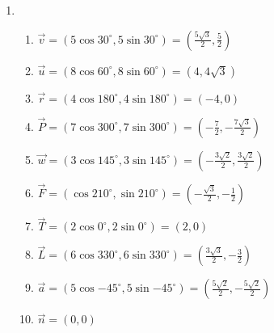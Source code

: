 \documentclass[a4paper]{article}
\newcommand{\exercise}{\item}
\newcommand{\SEL}[1]{ \left\{\begin{matrix} #1 \end{matrix}\right. }
\newcommand{\df}[2]{\displaystyle\frac{#1}{#2}}
\newcommand{\degs}{^{\circ}}
\begin{document}
\begin{enumerate}
\begin{enumerate} [label=(\alph*)]
		\item $|(0,5)| = \sqrt{0^2+5^2} = \sqrt{25} = 5$. $\theta= 90\degs$. $\SEL{v_x=5 \cos{90\degs} \\ v_y=5 \sin{90\degs} }$
		\item $|(-2,1)| = \sqrt{(-2)^2+1^2} = \sqrt{5}$. $\theta=\arctan\left(\df{1}{-2}\right) +180\degs \simeq 153.43\degs$. $\SEL{v_x \simeq \sqrt{5} \cos{153\degs} \\ v_y \simeq \sqrt{5} \sin{153\degs} }$
		\item $|(-3,-4)| = \sqrt{(-3)^2+(-4)^2} = \sqrt{25} = 5$. $\theta=\arctan\left(\df{-4}{-3}\right) +180\degs \simeq 233.13\degs$. $\SEL{v_x \simeq 5 \cos{233\degs} \\ v_y \simeq 5 \sin{233\degs} }$
		\item $|(-4,0)| = \sqrt{(-4)^2+0^2} = \sqrt{16} = 4$. $\theta= 180\degs$. $\SEL{v_x = 4 \cos{180\degs} \\ v_y = 4 \sin{180\degs} }$
		\item $|(0,0)| = \sqrt{0^2+0^2} = \sqrt{0} = 0$. No se define un ángulo. $\SEL{v_x = 0 \\ v_y= 0}$
\end{enumerate}\exercise\begin{enumerate} [label=(\alph*)]		\item $\vec{v}=(5 \cos{30\degs}, 5 \sin{30\degs})=\left(\df{5\sqrt{3}}{2}, \df{5}{2}\right)$
		\item $\vec{u}=(8 \cos{60\degs}, 8 \sin{60\degs})=( 4, 4\sqrt{3})$
		\item $\vec{r}=(4 \cos{180\degs}, 4 \sin{180\degs})= (-4,0)$
		\item $\vec{P}=(7 \cos{300\degs}, 7 \sin{300\degs})= \left(-\df{7}{2}, -\df{7\sqrt{3}}{2}\right)$
		\item $\vec{w}=(3 \cos{145\degs}, 3 \sin{145\degs})= \left(-\df{3\sqrt{2}}{2}, \df{3\sqrt{2}}{2}\right)$
		\item $\vec{F}=(\cos{210\degs}, \sin{210\degs})= \left(-\df{\sqrt{3}}{2}, -\df{1}{2}\right)$
		\item $\vec{T}=(2 \cos{0\degs}, 2 \sin{0\degs})= (2,0)$
		\item $\vec{L}=(6 \cos{330\degs}, 6 \sin{330\degs})= \left(\df{3\sqrt{3}}{2}, -\df{3}{2}\right)$
		\item $\vec{a}=(5 \cos{-45\degs}, 5 \sin{-45\degs})= \left(\df{5\sqrt{2}}{2}, -\df{5\sqrt{2}}{2}\right)$
		\item $\vec{n}=(0, 0)$

\end{enumerate}
\end{enumerate}
\end{document}
